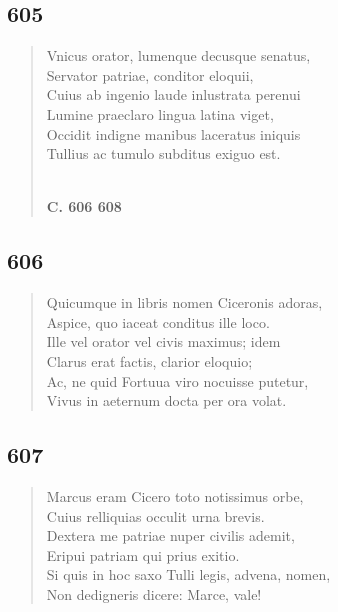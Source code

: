 \documentclass[11pt, a4paper]{report}
\begin{document}
            \subsection*{605}
      \begin{verse}
      Vnicus orator, lumenque decusque senatus, \\ Servator patriae, conditor eloquii, \\ Cuius ab ingenio laude inlustrata perenui \\ Lumine praeclaro lingua latina viget, \\ Occidit indigne manibus laceratus iniquis \\ Tullius ac tumulo subditus exiguo est. \\ 
        ﻿\pagebreak 
    \begin{center} \textbf{C. 606 608} \end{center} \marginpar{[88]} 
      \end{verse}
  
            \subsection*{606}
      \begin{verse}
      Quicumque in libris nomen Ciceronis adoras, \\ Aspice, quo iaceat conditus ille loco. \\ Ille vel orator vel civis maximus; idem \\ Clarus erat factis, clarior eloquio; \\ Ac, ne quid Fortuua viro nocuisse putetur, \\ Vivus in aeternum docta per ora volat. \\ 
      \end{verse}
  
            \subsection*{607}
      \begin{verse}
      Marcus eram Cicero toto notissimus orbe, \\ Cuius relliquias occulit urna brevis. \\ Dextera me patriae nuper civilis ademit, \\ Eripui patriam qui prius exitio. \\ Si quis in hoc saxo Tulli legis, advena, nomen, \\ Non dedigneris dicere: Marce, vale! \\ 
      \end{verse}
  
\end{document}
